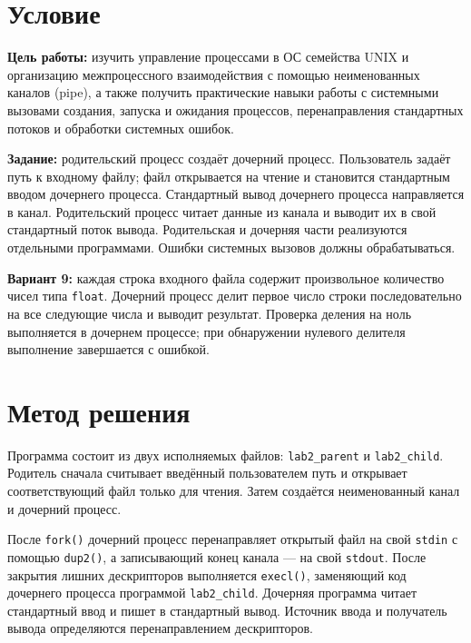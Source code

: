 \documentclass[12pt, a4paper]{article}
\begin{document}


\section{Условие}

\textbf{Цель работы:} изучить управление процессами в ОС семейства UNIX и
организацию межпроцессного взаимодействия с помощью неименованных каналов (pipe),
а также получить практические навыки работы с системными вызовами создания,
запуска и ожидания процессов, перенаправления стандартных потоков и обработки
системных ошибок.

\textbf{Задание:} родительский процесс создаёт дочерний процесс. Пользователь
задаёт путь к входному файлу; файл открывается на чтение и становится стандартным
вводом дочернего процесса. Стандартный вывод дочернего процесса направляется в
канал. Родительский процесс читает данные из канала и выводит их в свой стандартный
поток вывода. Родительская и дочерняя части реализуются отдельными программами.
Ошибки системных вызовов должны обрабатываться.

\textbf{Вариант 9:} каждая строка входного файла содержит произвольное количество
чисел типа \texttt{float}. Дочерний процесс делит первое число строки последовательно
на все следующие числа и выводит результат. Проверка деления на ноль выполняется
в дочернем процессе; при обнаружении нулевого делителя выполнение завершается с
ошибкой.

\section{Метод решения}

Программа состоит из двух исполняемых файлов: \texttt{lab2\_parent} и
\texttt{lab2\_child}. Родитель сначала считывает введённый пользователем путь и
открывает соответствующий файл только для чтения. Затем создаётся неименованный
канал и дочерний процесс.

После \texttt{fork()} дочерний процесс перенаправляет открытый файл на свой
\texttt{stdin} с помощью \texttt{dup2()}, а записывающий конец канала --- на свой
\texttt{stdout}. После закрытия лишних дескрипторов выполняется
\texttt{execl()}, заменяющий код дочернего процесса программой
\texttt{lab2\_child}. Дочерняя программа читает стандартный ввод и пишет в
стандартный вывод. Источник ввода и получатель вывода определяются перенаправлением
дескрипторов.
\end{document}
